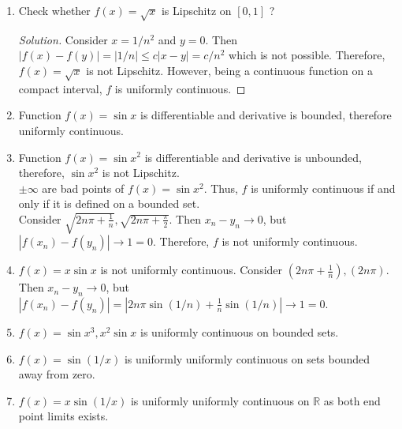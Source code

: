 \begin{enumerate}
\begin{proof}[Solution]
		When the domain of $f(x)=x^2$ is bounded, then both end point limits exists and $f(x)$ is continuous everywhere. Therefore $f(x)=x^2$ is uniformly continuous on every bounded set.
	\end{proof}
	\item Check whether $f(x) = \sqrt{x}$ is Lipschitz on $[0,1]$ ?
	\begin{proof}[Solution]
		Consider $x = 1/n^2$ and $y = 0$. Then $|f(x)-f(y)| = |1/n| \le c|x-y| = c/n^2$ which is not possible.
		Therefore, $f(x) = \sqrt{x}$ is not Lipschitz. However, being a continuous function on a compact interval, $f$ is uniformly continuous.
	\end{proof}
	\item Function $f(x) = \sin x$ is differentiable and derivative is bounded, therefore uniformly continuous.
	\item Function $f(x) = \sin x^2$ is differentiable and derivative is unbounded, therefore, $\sin x^2$ is not Lipschitz.\\

	$\pm \infty$ are bad points of $f(x) = \sin x^2$. Thus, $f$ is uniformly continuous if and only if it is defined on a bounded set.\\

	Consider $\sqrt{2n\pi+\frac{1}{n}}, \sqrt{2n\pi+\frac{\pi}{2}}$. Then $x_n - y_n \to 0$, but $|f(x_n) - f(y_n)| \to 1 = 0$. Therefore, $f$ is not uniformly continuous.
	\item $f(x) = x\sin x$ is not uniformly continuous.
		Consider $(2n\pi+\frac{1}{n}), (2n\pi)$. Then $x_n - y_n \to 0$, but $|f(x_n) - f(y_n)| = |2n\pi\sin (1/n) + \frac{1}{n} \sin (1/n)| \to 1 = 0$.

	\item $f(x) = \sin x^3, x^2 \sin x$ is uniformly continuous on bounded sets.
	\item $f(x) = \sin (1/x)$ is uniformly uniformly continuous on sets bounded away from zero.
	\item $f(x) = x \sin (1/x)$ is uniformly uniformly continuous on $\mathbb{R}$ as both end point limits exists.
\end{enumerate}

